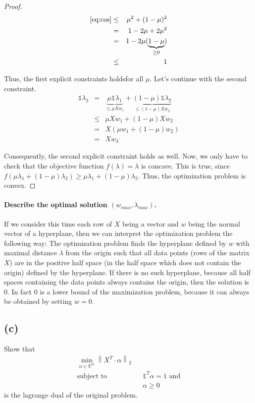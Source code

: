 \documentclass[a4paper, 11pt, titlepage]{article}
\newcommand{\norm}[1]{\left\lVert#1\right\rVert}
\begin{document}
\begin{proof}
	\begin{eqnarray*}
		\eqref{eq:cos} & \le & \mu^2 + (1-\mu)^2\\
		&=& 1 -2\mu +2\mu^2\\
		&=& 1-2\mu(\underbrace{1-\mu}_{\ge 0})\\
		&\le& 1
	\end{eqnarray*}
	
	Thus, the first explicit constraints holdsfor all $\mu$. Let's continue with the second constraint.
	\begin{eqnarray*}
		\mathds{1}\lambda_3 &=& \underbrace{\mu \mathds{1} \lambda_1}_{\le \mu Xw_1} + \underbrace{(1-\mu)\mathds{1}\lambda_2}_{\le (1-\mu)Xw_2}\\
		&\le& \mu X w_1 + (1-\mu)Xw_2\\
		&=& X(\mu w_1 + (1-\mu) w_2)\\
		&=& Xw_3
	\end{eqnarray*}
	
	Consequently, the second explicit constraint holds as well.
	Now, we only have to check that the objective function $f(\lambda)=\lambda$ is concave.
	This is true, since $f(\mu\lambda_1 + (1-\mu)\lambda_2) \ge \mu \lambda_1 + (1-\mu)\lambda_2$.
	Thus, the optimization problem is convex.
\end{proof}

\paragraph{Describe the optimal solution $(w_{max},\lambda_{max})$.} 
If we consider this time each row of $X$ being a vector and $w$ being the normal vector of a hyperplane, then we can interpret the optimization problem the following way:
The optimization problem finds the hyperplane defined by $w$ with maximal distance $\lambda$ from the origin such that all data points (rows of the matrix $X$) are in the positive half space (in the half space which does not contain the origin) defined by the hyperplane.
If there is no such hyperplane, because all half spaces containing the data points always contains the origin, then the solution is $0$.
In fact $0$ is a lower bound of the maximization problem, because it can always be obtained by setting $w=0$.

\subsection*{(c)}
Show that
\begin{eqnarray*}
	\min_{\alpha\in \mathbb{R}^m} \norm{X^T\cdot \alpha}_2&&\\
	\text{subject to} && \mathds{1}^T\alpha = 1 \text{ and}\\
	&& \alpha \ge 0
\end{eqnarray*}
is the lagrange dual of the original problem.
\end{document}
